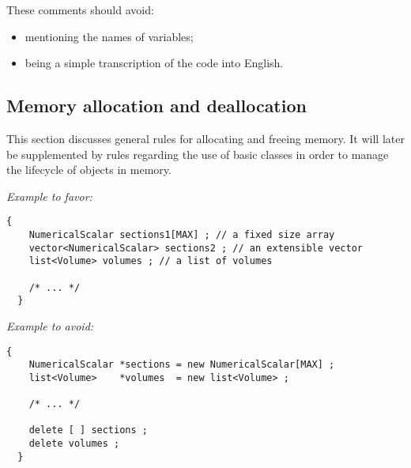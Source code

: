 
These comments should avoid:
\begin{itemize}
\item mentioning the names of variables;
\item being a simple transcription of the code into English.
\end{itemize}


\subsection {Memory allocation and deallocation}
This section discusses general rules for allocating and freeing memory. It will later be supplemented by rules regarding the use of basic classes in order to manage the lifecycle of objects in memory.

\emph{Example to favor:}
\begin{lstlisting}[frame=TBRL]
  {
    NumericalScalar sections1[MAX] ; // a fixed size array
    vector<NumericalScalar> sections2 ; // an extensible vector
    list<Volume> volumes ; // a list of volumes

    /* ... */
  }
\end{lstlisting}
\emph{Example to avoid:}
\begin{lstlisting}[frame=TBRL]
  {
    NumericalScalar *sections = new NumericalScalar[MAX] ;
    list<Volume>    *volumes  = new list<Volume> ;

    /* ... */

    delete [ ] sections ;
    delete volumes ;
  }
\end{lstlisting}

